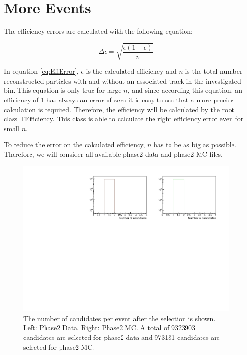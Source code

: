 \documentclass[a4paper,11pt,twosided,final,german,openbib,pdftex,listof=totoc,bibliography=totoc]{scrbook}
\begin{document}
\section{More Events}
\label{sec:Phase2MoreEvents}


The efficiency errors are calculated with the following equation:

\begin{equation}
\Delta \epsilon = \sqrt{\frac{\epsilon(1-\epsilon)}{n}}
\label{eq:EffError}
\end{equation}

In equation \ref{eq:EffError}, $\epsilon$ is the calculated efficiency and $n$ is the total number reconstructed particles with and without an associated track in the investigated bin. This equation is only true for large $n$, and since according this equation, an efficiency of 1 has always an error of zero it is easy to see that a more precise calculation is required. Therefore, the efficiency will be calculated by the root class TEfficiency. This class is able to calculate the right efficiency error even for small $n$. \cite{TEfficiency}



To reduce the error on the calculated efficiency, $n$ has to be as big as possible. Therefore, we will consider all available  phase2 data and phase2 MC files. 


\begin{figure}[h!]
	\includegraphics[width=\textwidth]{Plots/master/CCand.pdf}
	\caption[Total Number Of Events After The Selection]{The number of candidates per event after the selection is shown. Left: Phase2 Data. Right: Phase2 MC. A total of 9323903 candidates are selected for phase2 data and 973181 candidates are selected for phase2 MC.}
	\label{fig:nCandAS}
\end{figure}
\end{document}
